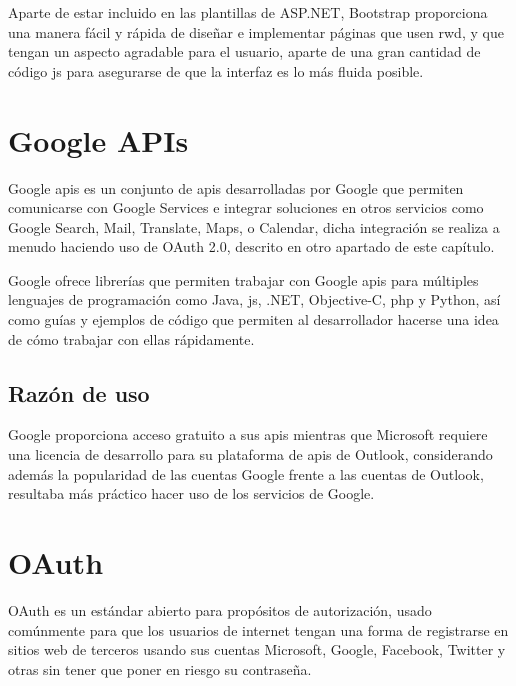 Aparte de estar incluido en las plantillas de ASP.NET, Bootstrap proporciona una manera fácil y rápida de diseñar e implementar páginas que usen \acrfull{rwd}, y que tengan un aspecto agradable para el usuario, aparte de una gran cantidad de código \acrfull{js} para asegurarse de que la interfaz es lo más fluida posible.

\section{Google APIs}

Google \acrshort{api}s\cite{GoogleAPIs} es un conjunto de \acrfull{api}s desarrolladas por Google que permiten comunicarse con Google Services e integrar soluciones en otros servicios como Google Search, Mail, Translate, Maps, o Calendar, dicha integración se realiza a menudo haciendo uso de OAuth 2.0, descrito en otro apartado de este capítulo.

Google ofrece librerías que permiten trabajar con Google \acrshort{api}s para múltiples lenguajes de programación como Java, \acrfull{js}, .NET, Objective-C, \acrshort{php} y Python, así como guías y ejemplos de código que permiten al desarrollador hacerse una idea de cómo trabajar con ellas rápidamente.

\subsection{Razón de uso}

Google proporciona acceso gratuito a sus \acrshort{api}s mientras que Microsoft requiere una licencia de desarrollo para su plataforma de \acrshort{api}s de Outlook, considerando además la popularidad de las cuentas Google frente a las cuentas de Outlook, resultaba más práctico hacer uso de los servicios de Google.

\section{OAuth}

OAuth es un estándar abierto para propósitos de autorización, usado comúnmente para que los usuarios de internet tengan una forma de registrarse en sitios web de terceros usando sus cuentas Microsoft, Google, Facebook, Twitter y otras sin tener que poner en riesgo su contraseña.

